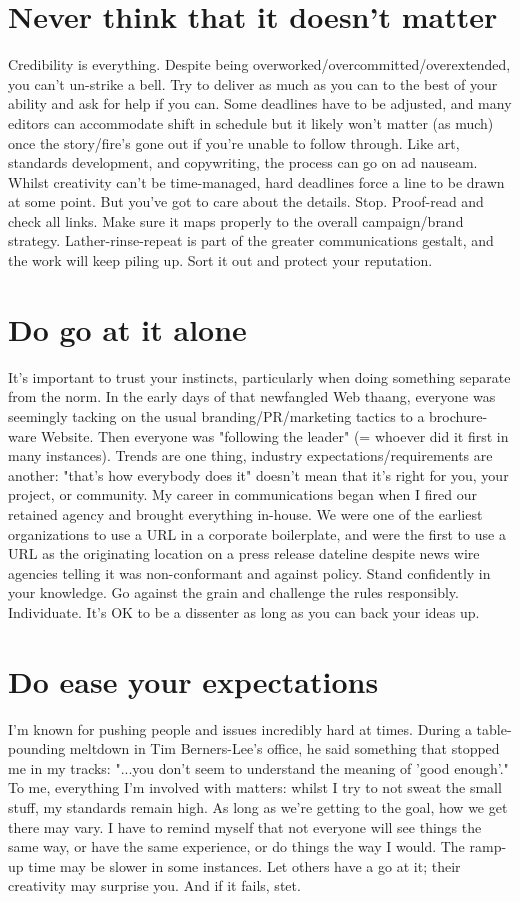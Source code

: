 \section*{Never think that it doesn't matter}
Credibility is everything. Despite being overworked/overcommitted/overextended,
you can't un-strike a bell. Try to deliver as much as you can to the best of
your ability and ask for help if you can. Some deadlines have to be adjusted,
and many editors can accommodate shift in schedule but it likely won't matter
(as much) once the story/fire's gone out if you're unable to follow through.
Like art, standards development, and copywriting, the process can go on ad
nauseam. Whilst creativity can't be time-managed, hard deadlines force a line to
be drawn at some point. But you've got to care about the details. Stop.
Proof-read and check all links. Make sure it maps properly to the overall
campaign/brand strategy. Lather-rinse-repeat is part of the greater
communications gestalt, and the work will keep piling up. Sort it out and
protect your reputation.

\section*{Do go at it alone}
It's important to trust your instincts, particularly when doing something
separate from the norm. In the early days of that newfangled Web thaang,
everyone was seemingly tacking on the usual branding/PR/marketing tactics to a
brochure-ware Website. Then everyone was "following the leader" (= whoever did
it first in many instances). Trends are one thing, industry
expectations/requirements are another: "that's how everybody does it" doesn't
mean that it's right for you, your project, or community. My career in
communications began when I fired our retained agency and brought everything
in-house. We were one of the earliest organizations to use a URL in a corporate
boilerplate, and were the first to use a URL as the originating location on a
press release dateline despite news wire agencies telling it was non-conformant
and against policy. Stand confidently in your knowledge. Go against the grain
and challenge the rules responsibly. Individuate. It's OK to be a dissenter as
long as you can back your ideas up.

\section*{Do ease your expectations}
I'm known for pushing people and issues incredibly hard at times. During a
table-pounding meltdown in Tim Berners-Lee's office, he said something that
stopped me in my tracks: "...you don't seem to understand the meaning of 'good
enough'." To me, everything I’m involved with matters: whilst I try to not sweat
the small stuff, my standards remain high. As long as we're getting to the goal,
how we get there may vary. I have to remind myself that not everyone will see
things the same way, or have the same experience, or do things the way I would.
The ramp-up time may be slower in some instances. Let others have a go at it;
their creativity may surprise you. And if it fails, stet.

